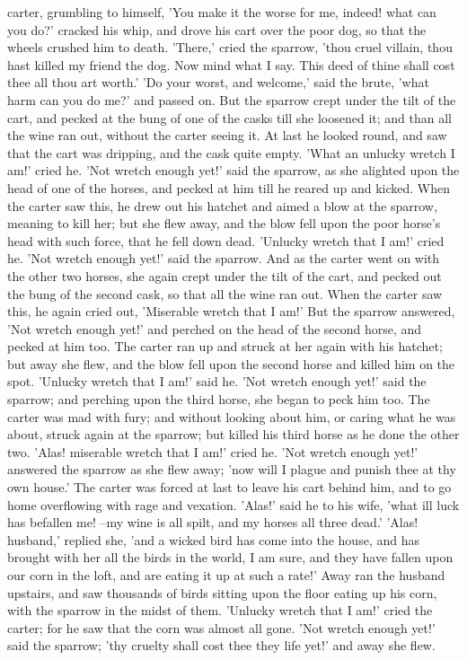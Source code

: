 \documentclass[12pt]{book}
\begin{document}
carter, grumbling to himself, 'You make it the worse for me, indeed!
what can you do?' cracked his whip, and drove his cart over the poor
dog, so that the wheels crushed him to death. 'There,' cried the
sparrow, 'thou cruel villain, thou hast killed my friend the dog. Now
mind what I say. This deed of thine shall cost thee all thou art
worth.' 'Do your worst, and welcome,' said the brute, 'what harm can
you do me?' and passed on. But the sparrow crept under the tilt of the
cart, and pecked at the bung of one of the casks till she loosened it;
and than all the wine ran out, without the carter seeing it. At last
he looked round, and saw that the cart was dripping, and the cask
quite empty. 'What an unlucky wretch I am!' cried he. 'Not wretch
enough yet!' said the sparrow, as she alighted upon the head of one of
the horses, and pecked at him till he reared up and kicked. When the
carter saw this, he drew out his hatchet and aimed a blow at the
sparrow, meaning to kill her; but she flew away, and the blow fell
upon the poor horse's head with such force, that he fell down dead.
'Unlucky wretch that I am!' cried he. 'Not wretch enough yet!' said
the sparrow. And as the carter went on with the other two horses, she
again crept under the tilt of the cart, and pecked out the bung of the
second cask, so that all the wine ran out. When the carter saw this,
he again cried out, 'Miserable wretch that I am!' But the sparrow
answered, 'Not wretch enough yet!' and perched on the head of the
second horse, and pecked at him too. The carter ran up and struck at
her again with his hatchet; but away she flew, and the blow fell upon
the second horse and killed him on the spot. 'Unlucky wretch that I
am!' said he. 'Not wretch enough yet!' said the sparrow; and perching
upon the third horse, she began to peck him too. The carter was mad
with fury; and without looking about him, or caring what he was about,
struck again at the sparrow; but killed his third horse as he done the
other two. 'Alas! miserable wretch that I am!' cried he. 'Not wretch
enough yet!' answered the sparrow as she flew away; 'now will I plague
and punish thee at thy own house.' The carter was forced at last to
leave his cart behind him, and to go home overflowing with rage and
vexation. 'Alas!' said he to his wife, 'what ill luck has befallen me!
--my wine is all spilt, and my horses all three dead.' 'Alas!
husband,' replied she, 'and a wicked bird has come into the house, and
has brought with her all the birds in the world, I am sure, and they
have fallen upon our corn in the loft, and are eating it up at such a
rate!' Away ran the husband upstairs, and saw thousands of birds
sitting upon the floor eating up his corn, with the sparrow in the
midst of them. 'Unlucky wretch that I am!' cried the carter; for he
saw that the corn was almost all gone. 'Not wretch enough yet!' said
the sparrow; 'thy cruelty shall cost thee they life yet!' and away she
flew.
\end{document}
